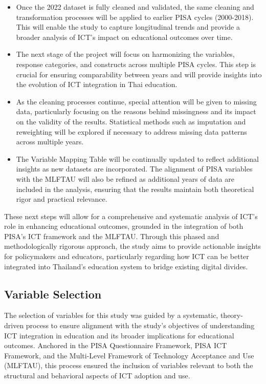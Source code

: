 \documentclass[
]{article}
\begin{document}
\begin{itemize}
\item
  Once the 2022 dataset is fully cleaned and validated, the same
  cleaning and transformation processes will be applied to earlier PISA
  cycles (2000-2018). This will enable the study to capture longitudinal
  trends and provide a broader analysis of ICT's impact on educational
  outcomes over time.
\item
  The next stage of the project will focus on harmonizing the variables,
  response categories, and constructs across multiple PISA cycles. This
  step is crucial for ensuring comparability between years and will
  provide insights into the evolution of ICT integration in Thai
  education.
\item
  As the cleaning processes continue, special attention will be given to
  missing data, particularly focusing on the reasons behind missingness
  and its impact on the validity of the results. Statistical methods
  such as imputation and reweighting will be explored if necessary to
  address missing data patterns across multiple years.
\item
  The Variable Mapping Table will be continually updated to reflect
  additional insights as new datasets are incorporated. The alignment of
  PISA variables with the MLFTAU will also be refined as additional
  years of data are included in the analysis, ensuring that the results
  maintain both theoretical rigor and practical relevance.
\end{itemize}

These next steps will allow for a comprehensive and systematic analysis
of ICT's role in enhancing educational outcomes, grounded in the
integration of both PISA's ICT framework and the MLFTAU. Through this
phased and methodologically rigorous approach, the study aims to provide
actionable insights for policymakers and educators, particularly
regarding how ICT can be better integrated into Thailand's education
system to bridge existing digital divides.

\hypertarget{variable-selection}{%
\subsection{Variable Selection}\label{variable-selection}}

The selection of variables for this study was guided by a systematic,
theory-driven process to ensure alignment with the study's objectives of
understanding ICT integration in education and its broader implications
for educational outcomes. Anchored in the PISA Questionnaire Framework,
PISA ICT Framework, and the Multi-Level Framework of Technology
Acceptance and Use (MLFTAU), this process ensured the inclusion of
variables relevant to both the structural and behavioral aspects of ICT
adoption and use.
\end{document}
